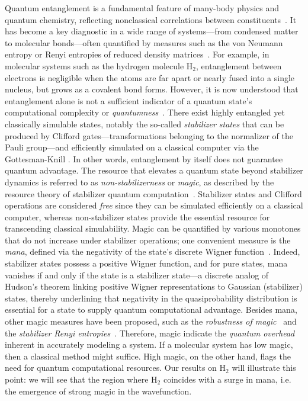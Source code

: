 \documentclass[aps, prl, twocolumn, groupedaddress, reprint, floatfix, nofootinbib, longbibliography]{revtex4-2}
\begin{document}
    Quantum entanglement is a fundamental feature of many-body physics and quantum chemistry, reflecting nonclassical correlations between constituents \cite{rissler2006measuring,boguslawski2015orbital,ding2025entanglement}. It has become a key diagnostic in a wide range of systems—from condensed matter to molecular bonds—often quantified by measures such as the von Neumann entropy or Renyi entropies of reduced density matrices \cite{szalay2017correlation}. For example, in molecular systems such as the hydrogen molecule H$_2$, entanglement between electrons is negligible when the atoms are far apart or nearly fused into a single nucleus, but grows as a covalent bond forms. However, it is now understood that entanglement alone is not a sufficient indicator of a quantum state’s computational complexity or \textit{quantumness} \cite{bravyi2005universal,howard2014contextuality}. There exist highly entangled yet classically simulable states, notably the so-called \textit{stabilizer states} that can be produced by Clifford gates—transformations belonging to the normalizer of the Pauli group—and efficiently simulated on a classical computer via the Gottesman-Knill \cite{gottesman1997stabilizer, gottesman1998theory, aaronson2004improved}. In other words, entanglement by itself does not guarantee quantum advantage. The resource that elevates a quantum state beyond stabilizer dynamics is referred to as \textit{non-stabilizerness} or \textit{magic}, as described by the resource theory of stabilizer quantum computation \cite{bravyi2005universal, bravyi2012magic, howard2014contextuality}. Stabilizer states and Clifford operations are considered \textit{free} since they can be simulated efficiently on a classical computer, whereas non-stabilizer states provide the essential resource for transcending classical simulability. Magic can be quantified by various monotones that do not increase under stabilizer operations; one convenient measure is the \textit{mana}, defined via the negativity of the state’s discrete Wigner function \cite{howard2014contextuality}. Indeed, stabilizer states possess a positive Wigner function, and for pure states, mana vanishes if and only if the state is a stabilizer state—a discrete analog of Hudson’s theorem linking positive Wigner representations to Gaussian (stabilizer) states, thereby underlining that negativity in the quasiprobability distribution is essential for a state to supply quantum computational advantage. Besides mana, other magic measures have been proposed, such as the \textit{robustness of magic} \cite{howard2017application,heinrich2019robustness,hamaguchi2024handbook} and the \textit{stabilizer Renyi entropies} \cite{leone2022stabilizer, haug2023stabilizer}. Therefore, magic indicate the \textit{quantum overhead} inherent in accurately modeling a system. If a molecular system has low magic, then a classical method might suffice. High magic, on the other hand, flags the need for quantum computational resources. Our results on H$_2$ will illustrate this point: we will see that the region where H$_2$ coincides with a surge in mana, i.e. the emergence of strong magic in the wavefunction.
\end{document}
